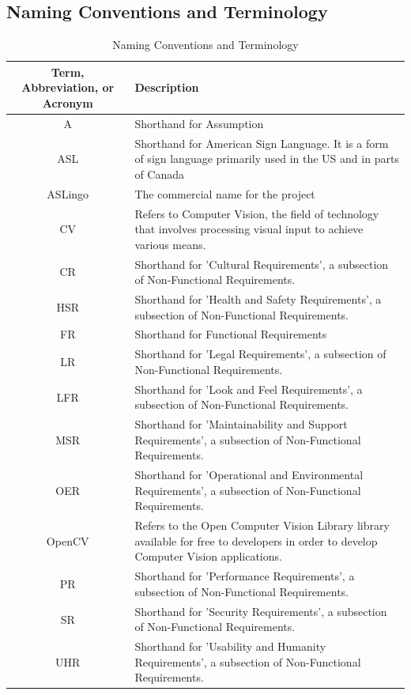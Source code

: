 \documentclass[12pt, titlepage]{article}
\begin{document}
\subsection{Naming Conventions and Terminology}

\begin{longtable}{| c | p{7cm} |}
\caption{Naming Conventions and Terminology} \\
\hline
\textbf{Term, Abbreviation, or Acronym} & \textbf{Description}\\
\hline
A & Shorthand for Assumption\\
\hline
ASL & Shorthand for American Sign Language. It is a form of sign language primarily used in the US and in parts of Canada\\
\hline
ASLingo & The commercial name for the project\\
\hline
CV & Refers to Computer Vision, the field of technology that involves processing visual input to achieve various means.\\
\hline
CR & Shorthand for 'Cultural Requirements', a subsection of Non-Functional Requirements.\\
\hline
HSR & Shorthand for 'Health and Safety Requirements', a subsection of Non-Functional Requirements.\\
\hline
FR & Shorthand for Functional Requirements\\
\hline
LR & Shorthand for 'Legal Requirements', a subsection of Non-Functional Requirements.\\
\hline
LFR & Shorthand for 'Look and Feel Requirements', a subsection of Non-Functional Requirements.\\
\hline
MSR & Shorthand for 'Maintainability and Support Requirements', a subsection of Non-Functional Requirements.\\
\hline
OER & Shorthand for 'Operational and Environmental Requirements', a subsection of Non-Functional Requirements.\\
\hline
OpenCV & Refers to the Open Computer Vision Library library available for free to developers in order to develop Computer Vision applications.\\
\hline
PR & Shorthand for 'Performance Requirements', a subsection of Non-Functional Requirements.\\
\hline
SR & Shorthand for 'Security Requirements', a subsection of Non-Functional Requirements.\\
\hline
UHR & Shorthand for 'Usability and Humanity Requirements', a subsection of Non-Functional Requirements.\\
\bottomrule
\end{longtable}
\end{document}
